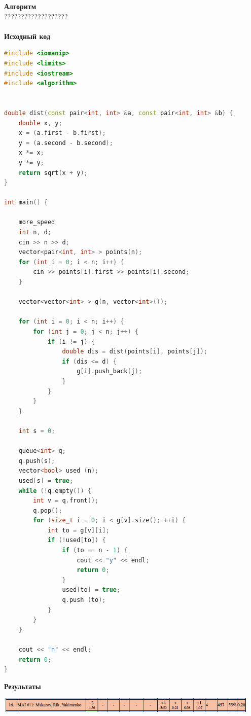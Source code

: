 \documentclass[a4paper,12pt]{article}
\begin{document}
\textbf{{\large Алгоритм}} \\
{\Huge ???????????????????} \\ 
\\
\textbf{{\large Исходный код}}
\begin{lstlisting}[language=C++]
#include <iomanip>
#include <limits>
#include <iostream>
#include <algorithm>


double dist(const pair<int, int> &a, const pair<int, int> &b) {
    double x, y;
    x = (a.first - b.first);
    y = (a.second - b.second);
    x *= x;
    y *= y;
    return sqrt(x + y);
}

int main() {

    more_speed
    int n, d;
    cin >> n >> d;
    vector<pair<int, int> > points(n);
    for (int i = 0; i < n; i++) {
        cin >> points[i].first >> points[i].second;
    }

    vector<vector<int> > g(n, vector<int>());

    for (int i = 0; i < n; i++) {
        for (int j = 0; j < n; j++) {
            if (i != j) {
                double dis = dist(points[i], points[j]);
                if (dis <= d) {
                    g[i].push_back(j);
                }
            }
        }
    }

    int s = 0;

    queue<int> q;
    q.push(s);
    vector<bool> used (n);
    used[s] = true;
    while (!q.empty()) {
        int v = q.front();
        q.pop();
        for (size_t i = 0; i < g[v].size(); ++i) {
            int to = g[v][i];
            if (!used[to]) {
                if (to == n - 1) {
                    cout << "y" << endl;
                    return 0;
                }
                used[to] = true;
                q.push (to);
            }
        }
    }

    cout << "n" << endl;
    return 0;
}
\end{lstlisting}

\textbf{{\large Результаты}} \\
\begin{center}
\includegraphics[width=0.95\textwidth]{OC_Japan/OC_Japan_result.png}\\ [1cm]
\end{center}



%
%
\newpage
\end{document}
